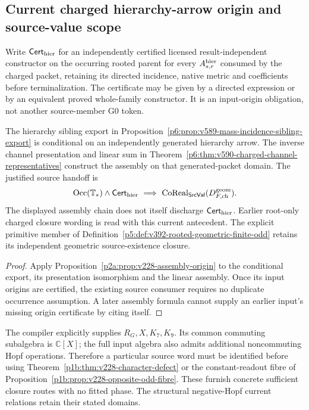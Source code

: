 \documentclass[12pt,a4paper]{article}
\begin{document}




\subsection{Current charged hierarchy-arrow origin and source-value scope}
\label{p5:sec:v228-charged-origin-correction}
\begin{definition}
\label{p5:def:v228-hierarchy-origin}
Write $\mathsf{Cert}_{\rm hier}$ for an independently certified licensed
result-independent constructor on the occurring rooted parent for every
$A_{s,r}^{\rm hier}$ consumed by the charged packet, retaining its directed
incidence, native metric and coefficients before terminalization.
The certificate may be given by a directed expression or by an equivalent
proved whole-family constructor. It is an input-origin obligation,
not another source-member G0 token.
\end{definition}
\begin{proposition}
\label{p5:prop:v228-charged-origin-scope}
The hierarchy sibling export in
Proposition~\ref{p6:prop:v589-mass-incidence-sibling-export} is conditional
on an independently generated hierarchy arrow. The inverse channel
presentation and linear sum in
Theorem~\ref{p6:thm:v590-charged-channel-representatives} construct the
assembly on that generated-packet domain. The justified source handoff is
\[
 \operatorname{Occ}(\mathbb T_*)\land\mathsf{Cert}_{\rm hier}
 \ \Longrightarrow\
 \operatorname{CoReal}_{\mathsf{SrcVal}}(D_{F,\rm ch}^{\rm geom}).
\]
The displayed assembly chain does not itself discharge
$\mathsf{Cert}_{\rm hier}$. Earlier root-only charged closure wording is
read with this current antecedent. The explicit primitive member of
Definition~\ref{p5:def:v392-rooted-geometric-finite-odd} retains its
independent geometric source-existence closure.
\end{proposition}
\begin{proof}
Apply Proposition~\ref{p2a:prop:v228-assembly-origin} to the conditional
export, its presentation isomorphism and the linear assembly. Once its
input origins are certified, the existing source consumer requires no
duplicate occurrence assumption. A later assembly formula cannot supply
an earlier input's missing origin certificate by citing itself.
\end{proof}
The compiler explicitly supplies $R_G,X,K_7,K_9$. Its common commuting
subalgebra is $\mathbb C[X]$; the full input algebra also admits additional
noncommuting Hopf operations. Therefore a particular source word must be
identified before using Theorem~\ref{p1b:thm:v228-character-defect} or
the constant-readout fibre of
Proposition~\ref{p1b:prop:v228-opposite-odd-fibre}.
These furnish concrete sufficient closure routes with no fitted phase.
The structural negative-Hopf current relations retain their stated domains.
\end{document}
